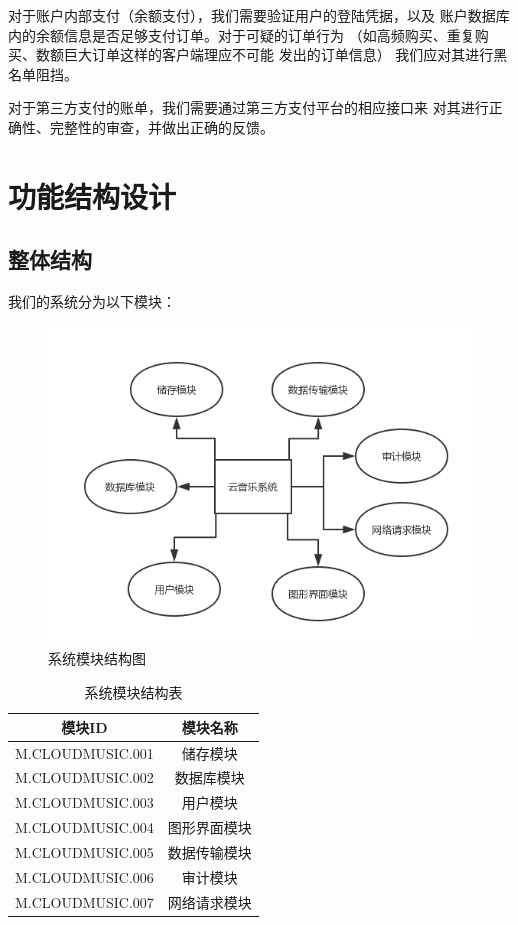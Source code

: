 对于账户内部支付（余额支付），我们需要验证用户的登陆凭据，以及
账户数据库内的余额信息是否足够支付订单。对于可疑的订单行为
（如高频购买、重复购买、数额巨大订单这样的客户端理应不可能
发出的订单信息）
我们应对其进行黑名单阻挡。

对于第三方支付的账单，我们需要通过第三方支付平台的相应接口来
对其进行正确性、完整性的审查，并做出正确的反馈。

\newpage
\section{功能结构设计}
\subsection{整体结构}

我们的系统分为以下模块：

\begin{figure}[h!]
\centering
\includegraphics[width=13cm]{images/do_5}
\caption{系统模块结构图}
\end{figure}

\begin{table}[h]
\centering
\caption{系统模块结构表} 
\begin{tabular}{|c|c|}
    \hline
    模块ID & 模块名称 \\
    \hline
    M.CLOUDMUSIC.001 & 储存模块 \\
    M.CLOUDMUSIC.002 & 数据库模块 \\
    M.CLOUDMUSIC.003 & 用户模块 \\
    M.CLOUDMUSIC.004 & 图形界面模块 \\
    M.CLOUDMUSIC.005 & 数据传输模块 \\
    M.CLOUDMUSIC.006 & 审计模块 \\
    M.CLOUDMUSIC.007 & 网络请求模块 \\
    \hline
\end{tabular}
\end{table}

